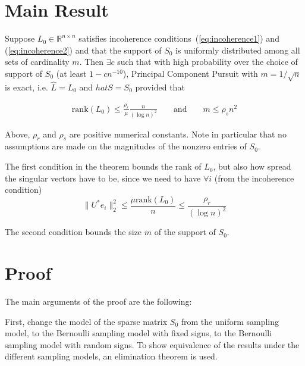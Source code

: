 
\section{Main Result}
\begin{theorem}
\label{thm:pcp}
Suppose $L_0 \in \mathbb{R}^{n \times n}$ satisfies incoherence conditions~(\ref{eq:incoherence1}) and (\ref{eq:incoherence2}) and that the support of $S_0$ is uniformly distributed among all sets of cardinality $m$. Then $\exists c$ such that with high probability over the choice of support of $S_0$ (at least $1-cn^{-10}$), Principal Component Pursuit with $m = 1/\sqrt{n}$ is exact, i.e. $\hat{L} = L_0$ and $hat{S} = S_0$ provided that

\begin{equation}
\begin{aligned}
\text{rank}(L_0) \leq \frac{\rho_r}{\mu} \frac{n}{(\log n)^2} && \text{ and } && m \leq \rho_s n^2
\end{aligned}
\end{equation}

\end{theorem}

Above, $\rho_r$ and $\rho_s$ are positive numerical constants. Note in particular that no assumptions are made on the magnitudes of the nonzero entries of $S_0$.

The first condition in the theorem bounds the rank of $L_0$, but also how spread the singular vectors have to be, since we need to have $\forall i$ (from the incoherence condition)
\[
\|U^*e_i\|_2^2 \leq \frac{\mu \text{rank}(L_0)}{n} \leq \frac{\rho_r}{(\log n)^2}
\]

The second condition bounds the size $m$ of the support of $S_0$.
\section{Proof}

The main arguments of the proof are the following:

First, change the model of the sparse matrix $S_0$ from the uniform sampling model, to the Bernoulli sampling model with fixed signs, to the Bernoulli sampling model with random signs. To show equivalence of the results under the different sampling models, an elimination theorem is used.

